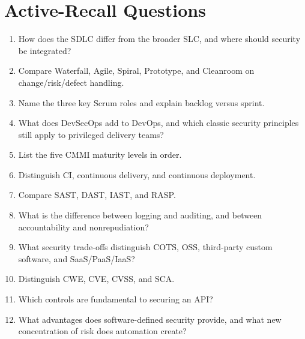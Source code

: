 \documentclass[10pt,letterpaper]{article}
\begin{document}
\section{\color{navy}Active-Recall Questions}
\begin{enumerate}
\item How does the SDLC differ from the broader SLC, and where should security be integrated?
\item Compare Waterfall, Agile, Spiral, Prototype, and Cleanroom on change/risk/defect handling.
\item Name the three key Scrum roles and explain backlog versus sprint.
\item What does DevSecOps add to DevOps, and which classic security principles still apply to privileged delivery teams?
\item List the five CMMI maturity levels in order.
\item Distinguish CI, continuous delivery, and continuous deployment.
\item Compare SAST, DAST, IAST, and RASP.
\item What is the difference between logging and auditing, and between accountability and nonrepudiation?
\item What security trade-offs distinguish COTS, OSS, third-party custom software, and SaaS/PaaS/IaaS?
\item Distinguish CWE, CVE, CVSS, and SCA.
\item Which controls are fundamental to securing an API?
\item What advantages does software-defined security provide, and what new concentration of risk does automation create?
\end{enumerate}
\end{document}

